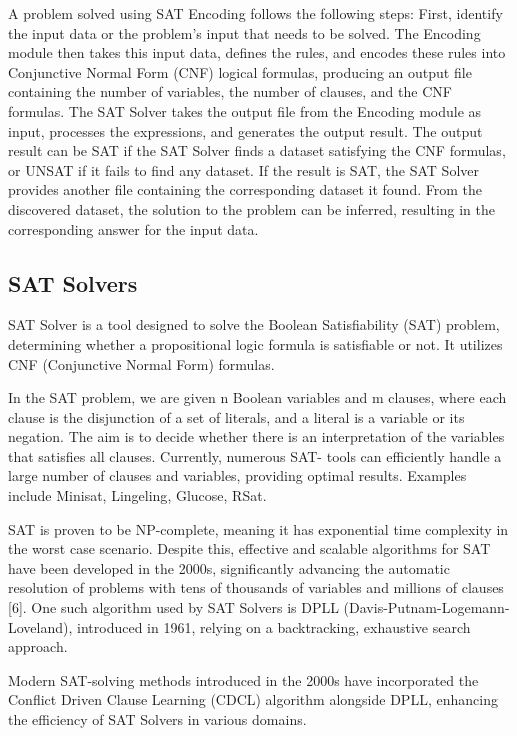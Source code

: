 A problem solved using SAT Encoding follows the following steps: First, identify the
input data or the problem's input that needs to be solved. The Encoding module then
takes this input data, defines the rules, and encodes these rules into Conjunctive Normal
Form\cite{cnf} (CNF) logical formulas, producing an output file containing the number of
variables, the number of clauses, and the CNF formulas. The SAT Solver takes the
output file from the Encoding module as input, processes the expressions, and generates
the output result. The output result can be SAT if the SAT Solver finds a dataset
satisfying the CNF formulas, or UNSAT if it fails to find any dataset. If the result is
SAT, the SAT Solver provides another file containing the corresponding dataset it
found. From the discovered dataset, the solution to the problem can be inferred, resulting
in the corresponding answer for the input data.

\subsection{SAT Solvers}
SAT Solver is a tool designed to solve the Boolean Satisfiability (SAT) problem,
determining whether a propositional logic formula is satisfiable or not. It utilizes CNF
(Conjunctive Normal Form\cite{cnf}) formulas.

In the SAT problem, we are given n Boolean variables and m clauses, where each clause
is the disjunction of a set of literals, and a literal is a variable or its negation. The aim is
to decide whether there is an interpretation of the variables that satisfies all clauses.
Currently, numerous SAT- tools can efficiently handle a large number of clauses and
variables, providing optimal results. Examples include Minisat\cite{minisat}, Lingeling\cite{lingeling},
Glucose\cite{glucose}, RSat\cite{rsat}.

SAT is proven to be NP-complete\cite{sat_np_complete}, meaning it has exponential time complexity in the
worst case scenario. Despite this, effective and scalable algorithms for SAT have been
developed in the 2000s, significantly advancing the automatic resolution of problems
with tens of thousands of variables and millions of clauses [6]. One such algorithm used
by SAT Solvers is DPLL (Davis-Putnam-Logemann-Loveland), introduced in 1961,
relying on a backtracking, exhaustive search approach.

Modern SAT-solving methods introduced in the 2000s have incorporated the Conflict
Driven Clause Learning (CDCL) algorithm alongside DPLL, enhancing the efficiency
of SAT Solvers in various domains.


